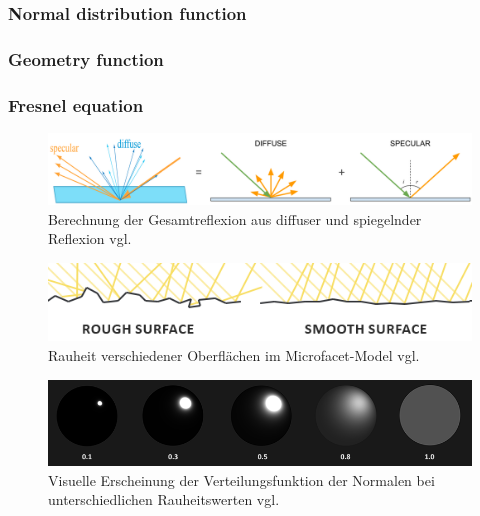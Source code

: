 \documentclass[
  11pt,
  a4paper,
  oneside
  ]{article}
\begin{document}
\subsubsection{Normal distribution function}
\subsubsection{Geometry function}
\subsubsection{Fresnel equation}
\begin{figure}[H]
  \centering
  \includegraphics*[width=0.9 \textwidth]{images/brdf.PNG}
  \caption{Berechnung der Gesamtreflexion aus diffuser und spiegelnder Reflexion vgl. \cite{learnOpenGL}}
  \label{fig:img1}
\end{figure}
\begin{figure}[H]
  \centering
  \includegraphics*[width=0.9 \textwidth]{images/microfacets_light_rays.png}
  \caption{Rauheit verschiedener Oberflächen im Microfacet-Model vgl. \cite{learnOpenGL}}
  \label{fig:img2}
\end{figure}
\begin{figure}[H]
  \centering
  \includegraphics*[width=0.9 \textwidth]{images/ndf.png}
  \caption{Visuelle Erscheinung der Verteilungsfunktion der Normalen bei unterschiedlichen Rauheitswerten vgl. \cite{learnOpenGL}}
  \label{fig:img3}
\end{figure}
\end{document}

